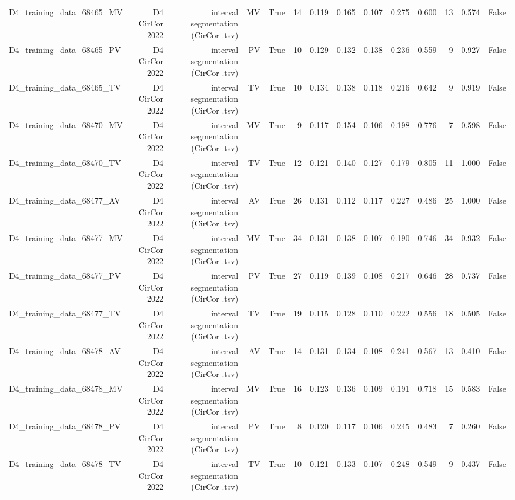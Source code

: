 \begin{table}[htbp]
\begin{tabular}{lrrrrrrrrrrrrr}
    D4\_training\_data\_68465\_MV & D4 CirCor 2022 & interval segmentation (CirCor .tsv) & MV & True & 14 & 0.119 & 0.165 & 0.107 & 0.275 & 0.600 & 13 & 0.574 & False \\
    D4\_training\_data\_68465\_PV & D4 CirCor 2022 & interval segmentation (CirCor .tsv) & PV & True & 10 & 0.129 & 0.132 & 0.138 & 0.236 & 0.559 & 9 & 0.927 & False \\
    D4\_training\_data\_68465\_TV & D4 CirCor 2022 & interval segmentation (CirCor .tsv) & TV & True & 10 & 0.134 & 0.138 & 0.118 & 0.216 & 0.642 & 9 & 0.919 & False \\
    D4\_training\_data\_68470\_MV & D4 CirCor 2022 & interval segmentation (CirCor .tsv) & MV & True & 9 & 0.117 & 0.154 & 0.106 & 0.198 & 0.776 & 7 & 0.598 & False \\
    D4\_training\_data\_68470\_TV & D4 CirCor 2022 & interval segmentation (CirCor .tsv) & TV & True & 12 & 0.121 & 0.140 & 0.127 & 0.179 & 0.805 & 11 & 1.000 & False \\
    D4\_training\_data\_68477\_AV & D4 CirCor 2022 & interval segmentation (CirCor .tsv) & AV & True & 26 & 0.131 & 0.112 & 0.117 & 0.227 & 0.486 & 25 & 1.000 & False \\
    D4\_training\_data\_68477\_MV & D4 CirCor 2022 & interval segmentation (CirCor .tsv) & MV & True & 34 & 0.131 & 0.138 & 0.107 & 0.190 & 0.746 & 34 & 0.932 & False \\
    D4\_training\_data\_68477\_PV & D4 CirCor 2022 & interval segmentation (CirCor .tsv) & PV & True & 27 & 0.119 & 0.139 & 0.108 & 0.217 & 0.646 & 28 & 0.737 & False \\
    D4\_training\_data\_68477\_TV & D4 CirCor 2022 & interval segmentation (CirCor .tsv) & TV & True & 19 & 0.115 & 0.128 & 0.110 & 0.222 & 0.556 & 18 & 0.505 & False \\
    D4\_training\_data\_68478\_AV & D4 CirCor 2022 & interval segmentation (CirCor .tsv) & AV & True & 14 & 0.131 & 0.134 & 0.108 & 0.241 & 0.567 & 13 & 0.410 & False \\
    D4\_training\_data\_68478\_MV & D4 CirCor 2022 & interval segmentation (CirCor .tsv) & MV & True & 16 & 0.123 & 0.136 & 0.109 & 0.191 & 0.718 & 15 & 0.583 & False \\
    D4\_training\_data\_68478\_PV & D4 CirCor 2022 & interval segmentation (CirCor .tsv) & PV & True & 8 & 0.120 & 0.117 & 0.106 & 0.245 & 0.483 & 7 & 0.260 & False \\
    D4\_training\_data\_68478\_TV & D4 CirCor 2022 & interval segmentation (CirCor .tsv) & TV & True & 10 & 0.121 & 0.133 & 0.107 & 0.248 & 0.549 & 9 & 0.437 & False \\

\end{tabular}
\end{table}
